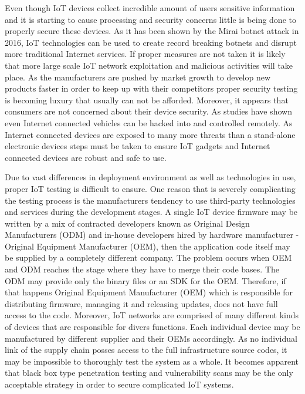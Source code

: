 Even though IoT devices collect incredible amount of users sensitive information and it is starting to cause processing and security concerns \cite{7069995} little is being done to properly secure these devices. As it has been shown by the Mirai botnet attack in 2016, IoT technologies can be used to create record breaking botnets and disrupt more traditional Internet services\cite{203628}. If proper measures are not taken it is likely that more large scale IoT network exploitation and malicious activities will take place. As the manufacturers are pushed by market growth to develop new products faster in order to keep up with their competitors proper security testing is becoming luxury that usually can not be afforded. Moreover, it appears that consumers are not concerned about their device security\cite{iotm}. As studies have shown even Internet connected vehicles can be hacked into and controlled remotely\cite{8071577}. As Internet connected devices are exposed to many more threats than a stand-alone electronic devices steps must be taken to ensure IoT gadgets and Internet connected devices are robust and safe to use.

Due to vast differences in deployment environment as well as technologies in use, proper IoT testing is difficult to ensure. One reason that is severely complicating the testing process is the manufacturers tendency to use third-party technologies and services during the development stages. A single IoT device firmware may be written by a mix of contracted developers known as Original Design Manufacturers (ODM) and in-house developers hired by hardware manufacturer - Original Equipment Manufacturer (OEM), then the application code itself may be supplied by a completely different company\cite{cookbook}. The problem occurs when OEM and ODM reaches the stage where they have to merge their code bases. The ODM may provide only the binary files or an SDK for the OEM. Therefore, if that happens Original Equipment Manufacturer (OEM) which is responsible for distributing firmware, managing it and releasing updates, does not have full access to the code. Moreover, IoT networks are comprised of many different kinds of devices that are responsible for divers functions. Each individual device may be manufactured by different supplier and their OEMs accordingly. As no individual link of the supply chain posses access to the full infrastructure source codes, it may be impossible to thoroughly test the system as a whole. It becomes apparent that black box type penetration testing and vulnerability scans may be the only acceptable strategy in order to secure complicated IoT systems.

